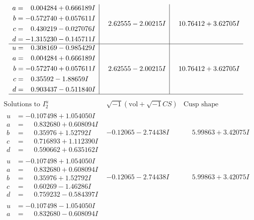 \documentclass[1p]{elsarticle_modified}
\theoremstyle{definition}
\newcommand{\I}{\sqrt{-1}}
\begin{document}
$$\begin{array}{c|c|c}
\begin{aligned}
a &= \phantom{-}0.004284 + 0.666189 I \\
b &= -0.572740 + 0.057611 I \\
c &= \phantom{-}0.430219 - 0.027076 I \\
d &= -1.315230 - 0.145711 I\end{aligned}
 & \phantom{-}2.62555 - 2.00215 I & \phantom{-}10.76412 + 3.62705 I \\ \hline\begin{aligned}
u &= \phantom{-}0.308169 - 0.985429 I \\
a &= \phantom{-}0.004284 + 0.666189 I \\
b &= -0.572740 + 0.057611 I \\
c &= \phantom{-}0.35592 - 1.88659 I \\
d &= \phantom{-}0.903437 - 0.511840 I\end{aligned}
 & \phantom{-}2.62555 - 2.00215 I & \phantom{-}10.76412 + 3.62705 I\\
 \hline 
 \end{array}$$\newpage$$\begin{array}{c|c|c}  
\text{Solutions to }I^u_{2}& \I (\text{vol} + \sqrt{-1}CS) & \text{Cusp shape}\\
 \hline 
\begin{aligned}
u &= -0.107498 + 1.054050 I \\
a &= \phantom{-}0.832680 + 0.608094 I \\
b &= \phantom{-}0.35976 + 1.52792 I \\
c &= \phantom{-}0.716893 + 1.112390 I \\
d &= \phantom{-}0.590662 + 0.635162 I\end{aligned}
 & -0.12065 - 2.74438 I & \phantom{-}5.99863 + 3.42075 I \\ \hline\begin{aligned}
u &= -0.107498 + 1.054050 I \\
a &= \phantom{-}0.832680 + 0.608094 I \\
b &= \phantom{-}0.35976 + 1.52792 I \\
c &= \phantom{-}0.60269 - 1.46286 I \\
d &= \phantom{-}0.759232 - 0.584397 I\end{aligned}
 & -0.12065 - 2.74438 I & \phantom{-}5.99863 + 3.42075 I \\ \hline\begin{aligned}
u &= -0.107498 - 1.054050 I \\
a &= \phantom{-}0.832680 - 0.608094 I \\

\end{aligned}
\end{array}$$
\end{document}
